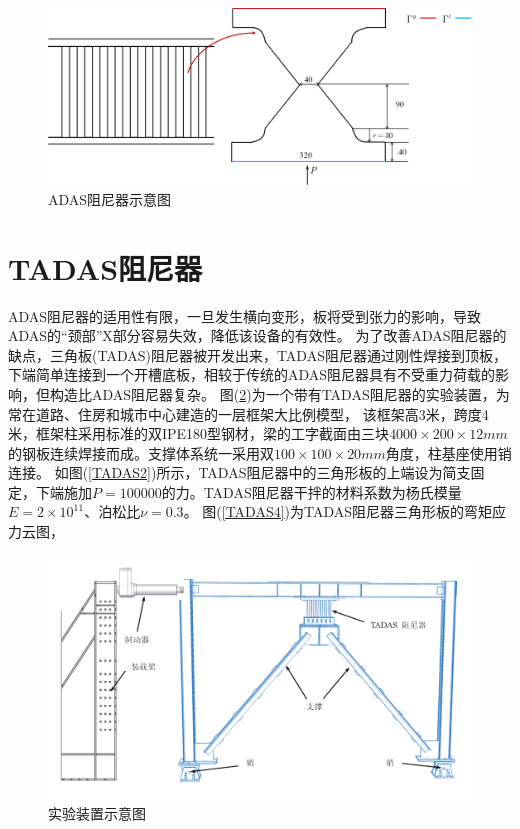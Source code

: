 \begin{figure}[H]
    \centering
    \includegraphics[scale=0.5]{figure/DAMPER/ADAS/2.png}
    \caption{ADAS阻尼器示意图}\label{ADAS2}
\end{figure}
\section{TADAS阻尼器}
ADAS阻尼器的适用性有限，一旦发生横向变形，板将受到张力的影响，导致ADAS的“颈部”X部分容易失效，降低该设备的有效性。
为了改善ADAS阻尼器的缺点，三角板(TADAS)阻尼器被开发出来，TADAS阻尼器通过刚性焊接到顶板，下端简单连接到一个开槽底板，相较于传统的ADAS阻尼器具有不受重力荷载的影响，但构造比ADAS阻尼器复杂。
图(\ref{TADAS1})为一个带有TADAS阻尼器的实验装置\cite{mohammadi2017,kim2016}，为常在道路、住房和城市中心建造的一层框架大比例模型，
该框架高3米，跨度4米，框架柱采用标准的双IPE180型钢材，梁的工字截面由三块$4000\times200\times12mm$的钢板连续焊接而成。支撑体系统一采用双$100\times100\times20mm$角度，柱基座使用销连接。
如图(\ref{TADAS2})所示，TADAS阻尼器中的三角形板的上端设为简支固定，下端施加$P=100000$的力。TADAS阻尼器干拌的材料系数为杨氏模量$E=2\times 10^{11}$、泊松比$\nu=0.3$。
图(\ref{TADAS4})为TADAS阻尼器三角形板的弯矩应力云图，
\begin{figure}[H]
    \centering
    \includegraphics[scale=0.4]{figure/DAMPER/TADAS/1.png}
    \caption{实验装置示意图\cite{mohammadi2017}}\label{TADAS1}
\end{figure}
